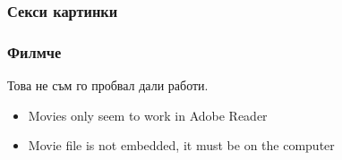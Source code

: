 \documentclass[serif,mathserif]{beamer}
\begin{document}
\begin{frame}
  \frametitle{Секси картинки}
  \begin{figure}[t]
    \centering
  \end{figure}
\end{frame}

\begin{frame}
  \frametitle{Филмче}
   Това не съм го пробвал дали работи.
  \begin{center}
  \end{center}
  \begin{itemize}
  \item Movies only seem to work in Adobe Reader
  \item Movie file is not embedded, it must be on the computer
  \end{itemize}
\end{frame}

\end{document}
